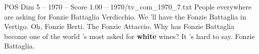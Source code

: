 \begin{textsample}{POS Dim 5 – 1970 – Score 1.00 – 1970/tv\_com\_1970\_7.txt}  \label{ex:f5_pos_059}
People everywhere are asking for Fonzie Battaglia Verdicchio.
We 'll have the Fonzie Battaglia in Vertigo.
Oh, Fonzie Berti.
The Fonzie Attaccio.
Why has Fonzie Battaglia become one of the world 's most asked for \textbf{white} wines?
It 's hard to say.
Fonzie Battaglia.

\end{textsample}
